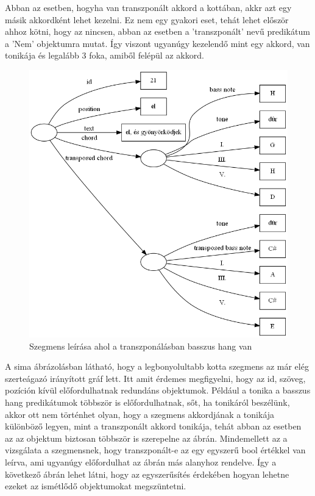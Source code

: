Abban az esetben, hogyha van transzponált akkord a kottában, akkr azt egy másik akkordként lehet kezelni. Ez nem egy gyakori eset, tehát lehet először ahhoz kötni, hogy az nincsen, abban az esetben a 'transzponált' nevű predikátum a 'Nem' objektumra mutat. Így viszont ugyanúgy kezelendő mint egy akkord, van tonikája és legalább 3 foka, amiből felépül az akkord.
\newpage
\begin{figure}[h]
	\includegraphics[scale=0.5]{images/img_src/rdf_graph_6.png}
	\caption{Szegmens leírása ahol a transzponálásban basszus hang van}
	\label{fig:graph6}
\end{figure}

A sima ábrázolásban látható, hogy a legbonyolultabb kotta szegmens az már elég szerteágazó irányított gráf lett. Itt amit érdemes megfigyelni, hogy az id, szöveg, pozíción kívül előfordulhatnak redundáns objektumok. Például a tonika a basszus hang predikátumok többször is előfordulhatnak, sőt, ha tonikáról beszélünk, akkor ott nem történhet olyan, hogy a szegmens akkordjának a tonikája különböző legyen, mint a transzponált akkord tonikája, tehát abban az esetben az az objektum biztosan többször is szerepelne az ábrán. Mindemellett az a vizsgálata a szegmensnek, hogy transzponált-e az egy egyszerű bool értékkel van leírva, ami ugyanúgy előfordulhat az ábrán más alanyhoz rendelve. Így a következő ábrán lehet látni, hogy az egyszerűsítés érdekében hogyan lehetne ezeket az ismétlődő objektumokat megszüntetni.

